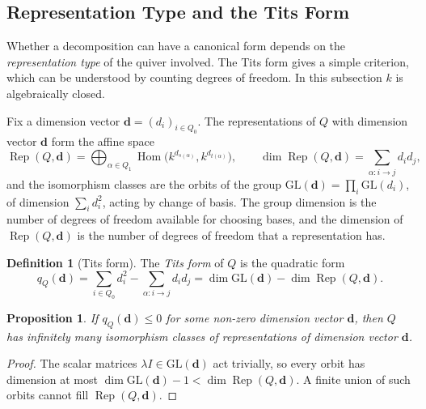 \documentclass[12pt, a4paper]{report}
\theoremstyle{plain}
\newtheorem{proposition}[theorem]{Proposition}
\theoremstyle{definition}
\newtheorem{definition}[theorem]{Definition}
\theoremstyle{remark}
\theoremstyle{plain}
\newcommand{\GL}{\mathrm{GL}}
\DeclareMathOperator{\Hom}{Hom}
\DeclareMathOperator{\Rep}{Rep}
\begin{document}
\subsection{Representation Type and the Tits Form}
\label{sec:tits_form}
Whether a decomposition can have a canonical form depends on the \emph{representation type} of the quiver involved. The Tits form gives a simple criterion, which can be understood by counting degrees of freedom. In this subsection $k$ is algebraically closed.

Fix a dimension vector $\mathbf d=(d_i)_{i\in Q_0}$. The representations of $Q$ with dimension vector $\mathbf d$ form the affine space
\[ \Rep(Q,\mathbf d)=\bigoplus_{\alpha\in Q_1}\Hom\bigl(k^{d_{s(\alpha)}},k^{d_{t(\alpha)}}\bigr),\qquad \dim\Rep(Q,\mathbf d)=\sum_{\alpha:i\to j}d_id_j, \]
and the isomorphism classes are the orbits of the group $\GL(\mathbf d)=\prod_i\GL(d_i)$, of dimension $\sum_id_i^2$, acting by change of basis. The group dimension is the number of degrees of freedom available for choosing bases, and the dimension of $\Rep(Q,\mathbf d)$ is the number of degrees of freedom that a representation has.

\begin{definition}[Tits form]\label{def:tits}
The \emph{Tits form} of $Q$ is the quadratic form
\[ q_Q(\mathbf d)=\sum_{i\in Q_0}d_i^2-\sum_{\alpha:i\to j}d_id_j=\dim\GL(\mathbf d)-\dim\Rep(Q,\mathbf d). \]
\end{definition}

\begin{proposition}\label{prop:tits-infinite}
If $q_Q(\mathbf d)\leq0$ for some non-zero dimension vector $\mathbf d$, then $Q$ has infinitely many isomorphism classes of representations of dimension vector $\mathbf d$.
\end{proposition}
\begin{proof}
The scalar matrices $\lambda I\in\GL(\mathbf d)$ act trivially, so every orbit has dimension at most $\dim\GL(\mathbf d)-1<\dim\Rep(Q,\mathbf d)$. A finite union of such orbits cannot fill $\Rep(Q,\mathbf d)$.
\end{proof}
\end{document}
